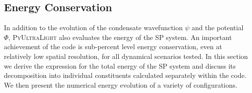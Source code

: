 \documentclass[a4paper,11pt]{article}
\newcommand{\PyUltraLight}{\textsc{PyUltraLight }}
\begin{document}
\vspace{1em}

\subsection{Energy Conservation}\label{sec:energy}

In addition to the evolution of the condensate wavefunction $\psi$ and the potential $\Phi$, \PyUltraLight also evaluates the energy of the SP system. An important achievement of the code is sub-percent level energy conservation, even at relatively low spatial resolution, for all dynamical scenarios tested. In this section we derive the expression for the total energy of the SP system and discuss its decomposition into individual constituents calculated separately within the code. We then present the numerical energy evolution of a variety of configurations. 
\end{document}
